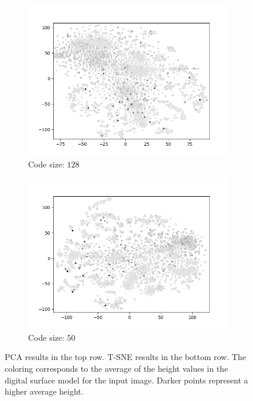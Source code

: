 \begin{figure}[H]
\begin{subfigure}{.25\textwidth}
        \includegraphics[width=\textwidth]{images/figures/experiments_latent/pooling_dim128_dsm.png}  
        \caption{Code size: $128$} 
    \end{subfigure}%
    \begin{subfigure}{.25\textwidth}
        \centering
        \includegraphics[width=\textwidth]{images/figures/experiments_latent/pooling_dim50_dsm.png}
        \caption{Code size: $50$}
    \end{subfigure}
    \caption{PCA results in the top row. 
    T-SNE results in the bottom row. 
    The coloring corresponds to the average of the height values in the digital surface model for the
    input image. Darker points represent a higher average height.} \label{figure_heights_pooling}
\end{figure}


